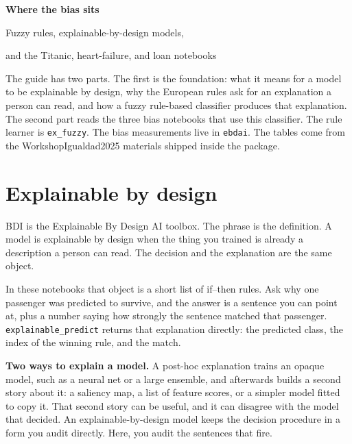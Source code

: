 \documentclass[11pt]{article}
\newcommand{\fn}[1]{\texttt{\small #1}}
\begin{document}
\color{ebdink}
\raggedbottom
\thispagestyle{fancy}

\begin{tcolorbox}[
  colback=ebdink, colframe=ebdink, arc=3pt,
  left=12pt, right=12pt, top=9pt, bottom=9pt,
  before skip=0pt, after skip=8pt,
]
{\color{white}\sffamily\bfseries\fontsize{21}{25}\selectfont Where the bias sits\par}
\vspace{3pt}
{\color{white!88}\sffamily Fuzzy rules, explainable-by-design models,\par and the Titanic, heart-failure, and loan notebooks\par}
\end{tcolorbox}

\noindent
The guide has two parts. The first is the foundation: what it means for a model to be explainable by design, why the European rules ask for an explanation a person can read, and how a fuzzy rule-based classifier produces that explanation. The second part reads the three bias notebooks that use this classifier. The rule learner is \fn{ex\_fuzzy}. The bias measurements live in \fn{ebdai}. The tables come from the WorkshopIgualdad2025 materials shipped inside the package.

\section{Explainable by design}
\label{sec:ebd}

BDI is the Explainable By Design AI toolbox. The phrase is the definition. A model is explainable by design when the thing you trained is already a description a person can read. The decision and the explanation are the same object.

In these notebooks that object is a short list of if--then rules. Ask why one passenger was predicted to survive, and the answer is a sentence you can point at, plus a number saying how strongly the sentence matched that passenger. \fn{explainable\_predict} returns that explanation directly: the predicted class, the index of the winning rule, and the match.

\begin{idea}
\textbf{Two ways to explain a model.} A post-hoc explanation trains an opaque model, such as a neural net or a large ensemble, and afterwards builds a second story about it: a saliency map, a list of feature scores, or a simpler model fitted to copy it. That second story can be useful, and it can disagree with the model that decided. An explainable-by-design model keeps the decision procedure in a form you audit directly. Here, you audit the sentences that fire.
\end{idea}
\end{document}

